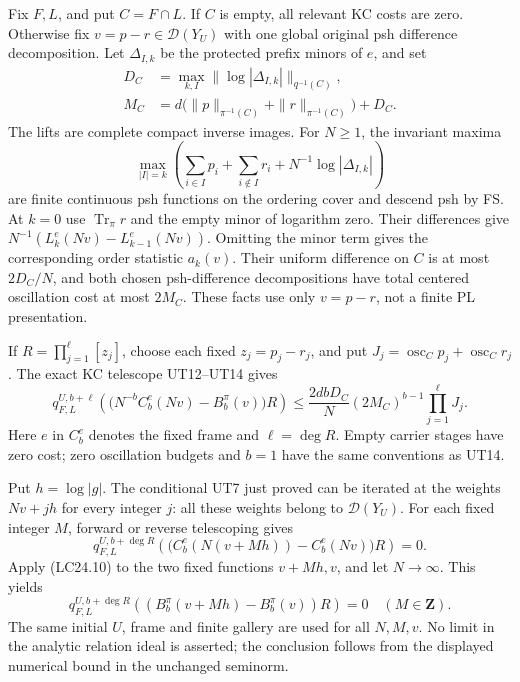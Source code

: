 Fix \(F,L\), and put \(C=F\cap L\). If \(C\) is empty,
all relevant KC costs are zero. Otherwise fix
\(v=p-r\in\mathcal D(Y_U)\) with one global original psh
difference decomposition. Let \(\Delta_{I,k}\) be the protected
prefix minors of \(e\), and set
\[
 \begin{aligned}
 D_C&=\max_{k,I}\|\log|\Delta_{I,k}|\|_{q^{-1}(C)},\\
 M_C&=d\bigl(\|p\|_{\pi^{-1}(C)}
                    +\|r\|_{\pi^{-1}(C)}\bigr)+D_C.
 \end{aligned}                                               \tag{LC24.8}
\]
The lifts are complete compact inverse images. For \(N\ge1\),
the invariant maxima
\[
 \max_{|I|=k}\left(
     \sum_{i\in I}p_i+\sum_{i\notin I}r_i
                      +N^{-1}\log|\Delta_{I,k}|\right)
                                                               \tag{LC24.9}
\]
are finite continuous psh functions on the ordering cover and
descend psh by FS. At \(k=0\) use \(\operatorname{Tr}_\pi r\)
and the empty minor of logarithm zero. Their differences give
\(N^{-1}(L_k^e(Nv)-L_{k-1}^e(Nv))\).
Omitting the minor term gives the corresponding order statistic
\(a_k(v)\). Their uniform difference on \(C\) is at most
\(2D_C/N\), and both chosen psh-difference decompositions have
total centered oscillation cost at most \(2M_C\).
These facts use only \(v=p-r\), not a finite PL presentation.

If \(R=\prod_{j=1}^{\ell}[z_j]\), choose each fixed
\(z_j=p_j-r_j\), and put
\(J_j=\operatorname{osc}_C p_j+\operatorname{osc}_C r_j\).
The exact KC telescope UT12--UT14 gives
\[
 q^{U,b+\ell}_{F,L}
 \left(\bigl(N^{-b}C_b^e(Nv)-B_b^\pi(v)\bigr)R\right)
 \le
 \frac{2dbD_C}{N}(2M_C)^{b-1}\prod_{j=1}^{\ell} J_j.              \tag{LC24.10}
\]
Here \(e\) in \(C_b^e\) denotes the fixed frame and
\(\ell=\deg R\).
Empty carrier stages have zero cost; zero oscillation budgets
and \(b=1\) have the same conventions as UT14.

Put \(h=\log|g|\). The conditional UT7 just proved can be
iterated at the weights \(Nv+jh\) for every integer \(j\):
all these weights belong to \(\mathcal D(Y_U)\).
For each fixed integer \(M\), forward or reverse telescoping
gives
\[
 q^{U,b+\deg R}_{F,L}
 \left(
  \bigl(C_b^e(N(v+Mh))-C_b^e(Nv)\bigr)R
 \right)=0 .
\]
Apply (LC24.10) to the two fixed functions \(v+Mh,v\),
and let \(N\to\infty\). This yields
\[
 q^{U,b+\deg R}_{F,L}
        \left((B_b^\pi(v+Mh)-B_b^\pi(v))R\right)=0
                    \quad(M\in\mathbf Z).                 \tag{LC24.11}
\]
The same initial \(U\), frame and finite gallery are used for
all \(N,M,v\). No limit in the analytic relation ideal is asserted;
the conclusion follows from the displayed numerical bound in
the unchanged seminorm.

